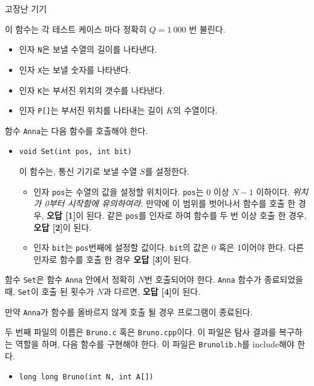 \begin{problem}{고장난 기기}
\begin{itemize}
		이 함수는 각 테스트 케이스 마다 정확히 $Q = 1\ 000$ 번 불린다.
		\begin{itemize}
			\item 인자 \texttt{N}은 보낼 수열의 길이를 나타낸다.
			\item 인자 \texttt{X}는 보낼 숫자를 나타낸다.
			\item 인자 \texttt{K}는 부서진 위치의 갯수를 나타낸다.
			\item 인자 \texttt{P[]}는 부서진 위치를 나타내는 길이 $K$의 수열이다.
		\end{itemize}
		
		함수 \texttt{Anna}는 다음 함수를 호출해야 한다.
		\begin{itemize}
			\item \texttt{void Set(int pos, int bit)}
			
			이 함수는, 통신 기기로 보낼 수열 $S$를 설정한다.
			
			\begin{itemize}
				\item 인자 \texttt{pos}는 수열의 값을 설정할 위치이다. \texttt{pos}는 0 이상 $N-1$ 이하이다. \textit{위치가 0부터 시작함에 유의하여라.} 만약에 이 범위를 벗어나서 함수를 호출 한 경우, \textbf{오답 [1]}이 된다. 같은 \texttt{pos}를 인자로 하여 함수를 두 번 이상 호출 한 경우, \textbf{오답 [2]}이 된다.
				
				\item 인자 \texttt{bit}는 \texttt{pos}번째에 설정할 값이다. \texttt{bit}의 값은 0 혹은 1이어야 한다. 다른 인자로 함수를 호출 한 경우 \textbf{오답 [3]}이 된다.
			\end{itemize}
			

		\end{itemize}
	
		함수 \texttt{Set}은 함수 \texttt{Anna} 안에서 정확히 $N$번 호출되어야 한다. \texttt{Anna} 함수가 종료되었을 때, \texttt{Set}이 호출 된 횟수가 $N$과 다르면, \textbf{오답 [4]}이 된다.
		
		만약 \texttt{Anna}가 함수를 올바르지 않게 호출 될 경우 프로그램이 종료된다.
		
	\end{itemize}

	두 번째 파일의 이름은 \texttt{Bruno.c} 혹은 \texttt{Bruno.cpp}이다. 이 파일은 탐사 결과를 복구하는 역할을 하며, 다음 함수를 구현해야 한다. 이 파일은 \texttt{Brunolib.h}를 include해야 한다.
	
	
	\begin{itemize}
		\item \texttt{long long Bruno(int N, int A[])}
		

\end{itemize}
\end{problem}
